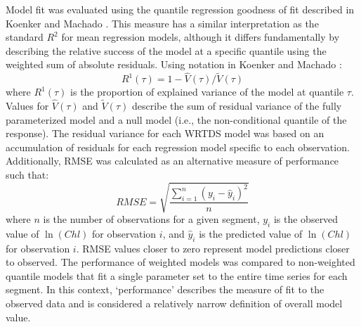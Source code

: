 \documentclass{svjour3}\usepackage[]{graphicx}\usepackage[]{color}
\begin{document}
Model fit was evaluated using the quantile regression goodness of fit described in Koenker and Machado \cite{Koenker99}.  This measure has a similar interpretation as the standard $R^2$ for mean regression models, although it differs fundamentally by describing the relative success of the model at a specific quantile using the weighted sum of absolute residuals. Using notation in Koenker and Machado \cite{Koenker99}:
\begin{equation}
R^1\left(\tau\right) = 1 - \hat{V}\left(\tau\right)/\tilde{V}\left(\tau\right)
\end{equation}
\noindent where $R^1\left(\tau\right)$ is the proportion of explained variance of the model at quantile $\tau$.  Values for $\hat{V}\left(\tau\right)$ and $\tilde{V}\left(\tau\right)$ describe the sum of residual variance of the fully parameterized model and a null model (i.e., the non-conditional quantile of the response).  The residual variance for each \ac{WRTDS} model was based on an accumulation of residuals for each regression model specific to each observation.  Additionally, \ac{RMSE} was calculated as an alternative measure of performance such that:
\begin{equation}
RMSE = \sqrt {{\frac{{\sum\limits_{{i = 1}}^n {{{\left( {{y_i} - {{\hat{y}}_i}} \right)}^2}} }}{{n}}}}
\end{equation}
\noindent where $n$ is the number of observations for a given segment, $y_i$ is the observed value of $\ln\left(Chl\right)$ for observation $i$, and ${\hat{y}}_i$ is the predicted value of $\ln\left(Chl\right)$ for observation $i$.  \ac{RMSE} values closer to zero represent model predictions closer to observed. The performance of weighted models was compared to non-weighted quantile models that fit a single parameter set to the entire time series for each segment.  In this context, `performance' describes the measure of fit to the observed data and is considered a relatively narrow definition of overall model value.  
\end{document}
